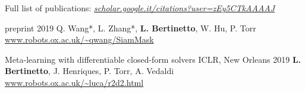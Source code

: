 


Full list of publications: 
\emph{\href{https://scholar.google.it/citations?user=zEy5CTkAAAAJ\&hl=en}{scholar.google.it/citations?user=zEy5CTkAAAAJ}}

\begin{cvpapers}
    {preprint} %
    {2019} %
  \cvpaperauthors
    {Q. Wang*, L. Zhang*, \textbf{L. Bertinetto}, W. Hu, P. Torr}
    {} %
    {} %
  \cvpaperurl
    {\href{http://www.robots.ox.ac.uk/~qwang/SiamMask/}{www.robots.ox.ac.uk/\textasciitilde qwang/SiamMask}}
    {} %
    {} %

  \cvpapertitle
    {Meta-learning with differentiable closed-form solvers} %
    {ICLR, New Orleans} %
    {2019} %
  \cvpaperauthors
    {\textbf{L. Bertinetto}, J. Henriques, P. Torr, A. Vedaldi}
    {} %
    {} %
  \cvpaperurl
    {\href{http://www.robots.ox.ac.uk/~luca/r2d2.html}{www.robots.ox.ac.uk/\textasciitilde luca/r2d2.html}}
    {} %
    {} %


\end{cvpapers}

